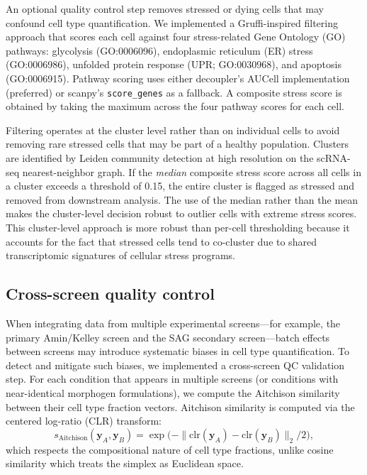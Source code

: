 \documentclass[times,twoside]{zHenriquesLab-StyleBioRxiv}
\begin{document}
An optional quality control step removes stressed or dying cells that may confound cell type quantification. We implemented a Gruffi-inspired filtering approach \cite{He2024hnoca} that scores each cell against four stress-related Gene Ontology (GO) pathways: glycolysis (GO:0006096), endoplasmic reticulum (ER) stress (GO:0006986), unfolded protein response (UPR; GO:0030968), and apoptosis (GO:0006915). Pathway scoring uses either decoupler's AUCell implementation (preferred) or scanpy's \texttt{score\_genes} as a fallback. A composite stress score is obtained by taking the maximum across the four pathway scores for each cell.

Filtering operates at the cluster level rather than on individual cells to avoid removing rare stressed cells that may be part of a healthy population. Clusters are identified by Leiden community detection at high resolution on the scRNA-seq nearest-neighbor graph. If the \emph{median} composite stress score across all cells in a cluster exceeds a threshold of 0.15, the entire cluster is flagged as stressed and removed from downstream analysis. The use of the median rather than the mean makes the cluster-level decision robust to outlier cells with extreme stress scores. This cluster-level approach is more robust than per-cell thresholding because it accounts for the fact that stressed cells tend to co-cluster due to shared transcriptomic signatures of cellular stress programs.

\subsection*{Cross-screen quality control}

When integrating data from multiple experimental screens---for example, the primary Amin/Kelley screen and the SAG secondary screen---batch effects between screens may introduce systematic biases in cell type quantification. To detect and mitigate such biases, we implemented a cross-screen QC validation step. For each condition that appears in multiple screens (or conditions with near-identical morphogen formulations), we compute the Aitchison similarity between their cell type fraction vectors. Aitchison similarity is computed via the centered log-ratio (CLR) transform:
\begin{equation}
  s_\text{Aitchison}(\bm{y}_A, \bm{y}_B) = \exp\!\bigl(-\|\text{clr}(\bm{y}_A) - \text{clr}(\bm{y}_B)\|_2 / 2\bigr),
\end{equation}
which respects the compositional nature of cell type fractions, unlike cosine similarity which treats the simplex as Euclidean space.
\end{document}
